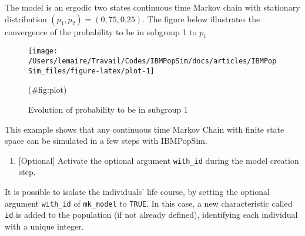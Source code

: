 The model is an ergodic two states continuous time Markov chain with stationary distribution \((p_1,p_2)=(0,75,0.25)\). The figure below illustrates the convergence of the probability to be in subgroup 1 to \(p_1\)

\begin{Shaded}
\begin{Highlighting}[]
\StringTok{ }
\StringTok{ }\OperatorTok{$}
                      \NormalTok{(}\NormalTok{(}\OperatorTok{==}\NormalTok{))}\OperatorTok{/}
\NormalTok{                \})}
\end{Highlighting}
\end{Shaded}

\begin{figure}

{\centering \texttt{[image: /Users/lemaire/Travail/Codes/IBMPopSim/docs/articles/IBMPopSim\_files/figure-latex/plot-1]} 

}

\caption{Evolution of probability to be in subgroup 1}(\#fig:plot)
\end{figure}

This example shows that any continuous time Markov Chain with finite state space can be simulated in a few steps with IBMPopSim.

\begin{enumerate}
\def\labelenumi{\arabic{enumi}.}
\setcounter{enumi}{1}
\tightlist
\item
  {[}Optional{]} Activate the optional argument \texttt{with\_id} during the model creation step.
\end{enumerate}

It is possible to isolate the individuals' life course, by setting the optional argument \texttt{with\_id} of \texttt{mk\_model} to \texttt{TRUE}. In this case, a new characteristic called \texttt{id} is added to the population (if not already defined), identifying each individual with a unique integer.

\begin{Shaded}
\begin{Highlighting}[]
\StringTok{ }\NormalTok{(}   
                           \NormalTok{)          }
\end{Highlighting}
\end{Shaded}

